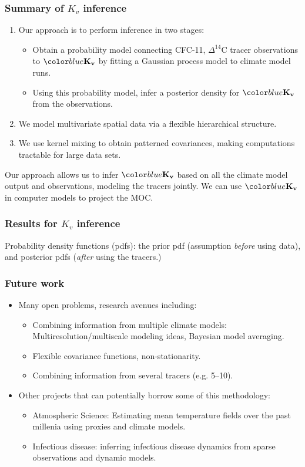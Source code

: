 \documentclass{beamer}
\begin{document}
\begin{frame}
  \frametitle{Summary of $K_v$ inference}
 \begin{enumerate}
 \item Our approach is to perform inference in two stages:
\begin{itemize}
\item Obtain a probability model connecting CFC-11, $\Delta^{14}$C tracer
  observations to $\Kv$ by fitting a Gaussian process model to climate
  model runs.
\item Using this probability model, infer a posterior density for
  $\Kv$ from the observations.
\end{itemize}
\item We model multivariate spatial data via a flexible hierarchical structure.
\item We use kernel mixing to obtain patterned covariances, making
  computations tractable for large data sets.
\end{enumerate}
 Our approach allows us to infer $\Kv$ based on all the climate model
 output and observations,
  modeling the tracers jointly. We can use $\Kv$ in computer models to
  project the MOC.
\end{frame}

\begin{frame}
\frametitle{Results for $K_v$ inference }
 Probability density functions (pdfs): the prior pdf
      (assumption {\it before} using data), and posterior pdfs ({\it after} using the tracers.)
\end{frame}


\begin{frame}
  \frametitle{Future work  }
 \begin{itemize}
\item Many open problems, research avenues including:
 \begin{itemize}
\item Combining information from multiple climate models: Multiresolution/multiscale modeling ideas, Bayesian model averaging.
\item Flexible covariance functions, non-stationarity.
\item Combining information from several tracers (e.g. 5--10). %
        \end{itemize}
    \item Other projects that can potentially borrow some of this methodology: 
     \begin{itemize}
       \item Atmospheric Science: Estimating mean temperature fields over the past millenia using proxies and climate models.
       \item Infectious disease: inferring infectious disease dynamics from sparse observations and dynamic models.
    \end{itemize}
     \end{itemize}
\end{frame}
\end{document}
